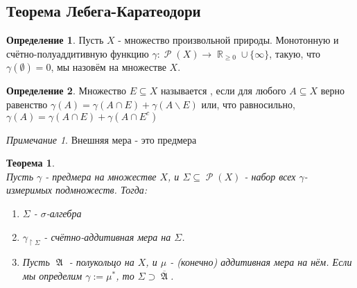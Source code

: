 \documentclass[a4paper]{article}
\theoremstyle{indented}
\newtheorem{theorem}{Теорема}
\theoremstyle{definition}
\newtheorem{defn}{Определение}
\theoremstyle{remark}
\newtheorem{remark}{Примечание}
\DeclareMathOperator{\ra}{\rightarrow}
\DeclareMathOperator{\RR}{\mathbb{R}}
\DeclareMathOperator{\GA}{\mathfrak{A}}
\DeclareMathOperator{\Rho}{\mathcal{P}}
\begin{document}
\subsection{Теорема Лебега-Каратеодори}
\begin{defn}
Пусть $X$ - множество произвольной природы. Монотонную и счётно-полуаддитивную функцию $\gamma: \Rho(X) \ra \RR_{\geq 0} \cup \{\infty\}$, такую, что $\gamma(\emptyset)=0$, мы назовём  на множестве $X$.
\end{defn}
\begin{defn}
Множество $E \subseteq X$ называется , если для любого $A \subseteq X$ верно равенство $\gamma(A) = \gamma(A \cap E) + \gamma(A \backslash E)$ или, что равносильно, $\gamma(A)=\gamma(A \cap E) + \gamma (A \cap E^{c})$
\end{defn}
\begin{remark}
Внешняя мера - это предмера
\end{remark}
\begin{theorem}
\\
Пусть $\gamma$ - предмера на множестве $X$, и $\Sigma \subseteq \Rho(X)$ - набор всех $\gamma$- измеримых подмножеств. Тогда:
\begin{enumerate}
    \item $\Sigma$ - $\sigma$-алгебра
    \item $\gamma_{\upharpoonright \Sigma}$ - счётно-аддитивная мера на $\Sigma$.
    \item Пусть $\GA$ - полукольцо на $X$, и $\mu$ - (конечно) аддитивная мера на нём. Если мы определим $\gamma:=\mu^*$, то $\Sigma \supset \overline{\GA}$.
\end{enumerate}
\end{theorem}
\end{document}
